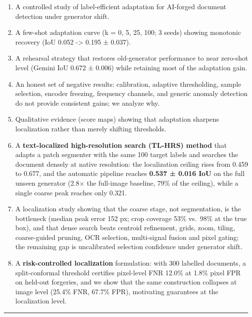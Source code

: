 \begin{enumerate}
\def\labelenumi{\arabic{enumi}.}
\tightlist
\item
  A controlled study of label-efficient adaptation for AI-forged document detection under generator shift.
\item
  A few-shot adaptation curve (k = 0, 5, 25, 100; 3 seeds) showing monotonic recovery (IoU 0.052 -\textgreater{} 0.195 ± 0.037).
\item
  A rehearsal strategy that restores old-generator performance to near zero-shot level (Gemini IoU 0.672 ± 0.006) while retaining most of the adaptation gain.
\item
  An honest set of negative results: calibration, adaptive thresholding, sample selection, encoder freezing, frequency channels, and generic anomaly detection do not provide consistent gains; we analyze why.
\item
  Qualitative evidence (score maps) showing that adaptation sharpens localization rather than merely shifting thresholds.
\item
  A \textbf{text-localized high-resolution search (TL-HRS) method} that adapts a patch segmenter with the same 100 target labels and searches the document densely at native resolution: the localization ceiling rises from 0.459 to 0.677, and the automatic pipeline reaches \textbf{0.537 ± 0.016 IoU} on the full unseen generator (2.8× the full-image baseline, 79\% of the ceiling), while a single coarse peak reaches only 0.321.
\item
  A localization study showing that the coarse stage, not segmentation, is the bottleneck (median peak error 152 px; crop coverage 53\% vs.~98\% at the true box), and that dense search beats centroid refinement, grids, zoom, tiling, coarse-guided pruning, OCR selection, multi-signal fusion and pixel gating; the remaining gap is uncalibrated selection confidence under generator shift.
\item
  A \textbf{risk-controlled localization} formulation: with 300 labelled documents, a split-conformal threshold certifies pixel-level FNR 12.0\% at 1.8\% pixel FPR on held-out forgeries, and we show that the same construction collapses at image level (25.4\% FNR, 67.7\% FPR), motivating guarantees at the localization level.
\end{enumerate}

\begin{center}\rule{0.5\linewidth}{0.5pt}\end{center}

